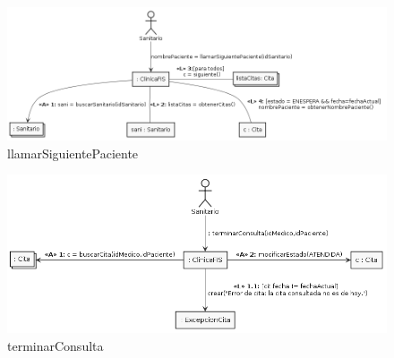 \documentclass[11pt,a4paper]{article}
\begin{document}
\begin{figure}[H]
	\caption{llamarSiguientePaciente}
	\centering
	\includegraphics[width=\textwidth,height=\textheight,keepaspectratio]{Diagramas/llamarsiguientepaciente}
\end{figure}

\begin{figure}[H]
	\caption{terminarConsulta}
	\centering
	\includegraphics[width=\textwidth,height=\textheight,keepaspectratio]{Diagramas/terminarconsulta}
\end{figure}
\end{document}
